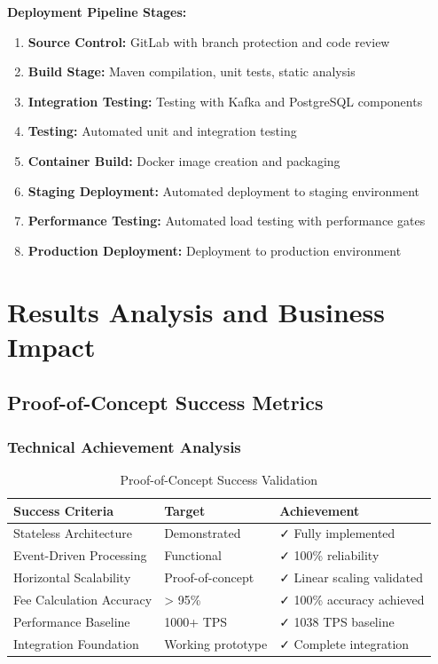 \textbf{Deployment Pipeline Stages:}
\begin{enumerate}
    \item \textbf{Source Control:} GitLab with branch protection and code review
    \item \textbf{Build Stage:} Maven compilation, unit tests, static analysis
    \item \textbf{Integration Testing:} Testing with Kafka and PostgreSQL components
    \item \textbf{Testing:} Automated unit and integration testing
    \item \textbf{Container Build:} Docker image creation and packaging
    \item \textbf{Staging Deployment:} Automated deployment to staging environment
    \item \textbf{Performance Testing:} Automated load testing with performance gates
    \item \textbf{Production Deployment:} Deployment to production environment
\end{enumerate}

\section{Results Analysis and Business Impact}

\subsection{Proof-of-Concept Success Metrics}

\subsubsection{Technical Achievement Analysis}

\begin{table}[h]
\centering
\begin{tabular}{|l|l|l|}
\hline
\textbf{Success Criteria} & \textbf{Target} & \textbf{Achievement} \\
\hline
Stateless Architecture & Demonstrated & ✓ Fully implemented \\
Event-Driven Processing & Functional & ✓ 100\% reliability \\
Horizontal Scalability & Proof-of-concept & ✓ Linear scaling validated \\
Fee Calculation Accuracy & > 95\% & ✓ 100\% accuracy achieved \\
Performance Baseline & 1000+ TPS & ✓ 1038 TPS baseline \\
Integration Foundation & Working prototype & ✓ Complete integration \\
\hline
\end{tabular}
\caption{Proof-of-Concept Success Validation}
\end{table}

